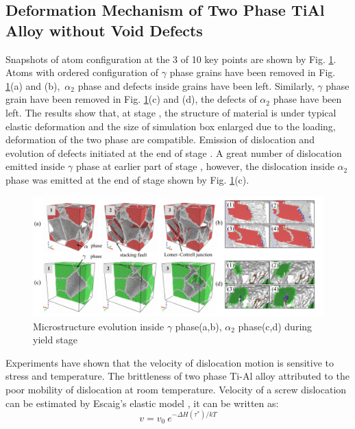 \documentclass[Unknown,article,submit,moreauthors,pdftex,10pt,a4paper]{Definitions/mdpi}
\begin{document}
\subsection{Deformation Mechanism of Two Phase TiAl Alloy without Void Defects}
Snapshots of atom configuration at the 3 of 10 key points are shown by Fig. \ref{fig:Defect}.  Atoms with ordered configuration  of $\gamma$ phase grains have been removed in Fig. \ref{fig:Defect}(a) and (b),\ $\alpha_2$ phase and defects inside grains have been left. Similarly, $\gamma$ phase grain have been removed in Fig. \ref{fig:Defect}(c) and (d), the defects of $\alpha_2$ phase have been left.  The results show that, at stage \uppercase\expandafter{}, the structure of material is under typical elastic deformation and the size of simulation box enlarged due to the loading, deformation of the two phase are compatible. Emission of dislocation and evolution of defects initiated at the end of stage \uppercase\expandafter{}. A  great number of dislocation emitted inside $\gamma$ phase at earlier part of stage \uppercase\expandafter{}, however, the dislocation inside $\alpha_2$ phase was emitted at the end of stage \uppercase\expandafter{} shown by Fig. \ref{fig:Defect}(c).  
\begin{figure}[ht] 
	\centering
	\includegraphics[width=1\linewidth]{img/def-box}
	\caption{Microstructure evolution inside $\gamma$ phase(a,b), $\alpha_2$ phase(c,d) during yield stage}
	\label{fig:Defect}
\end{figure}
Experiments have shown that the velocity of dislocation motion is sensitive to stress and temperature\cite{Stein1960}. The brittleness of two phase Ti-Al alloy attributed to the poor mobility of dislocation at room temperature. Velocity of a screw dislocation can be estimated by Escaig's elastic model \cite{Escaig1968}, it can be written as:
\begin{equation}\label{eq:temp-dis}
v = v_0\ e^{-\Delta H(\tau^*)/kT}
\end{equation}
\end{document}
